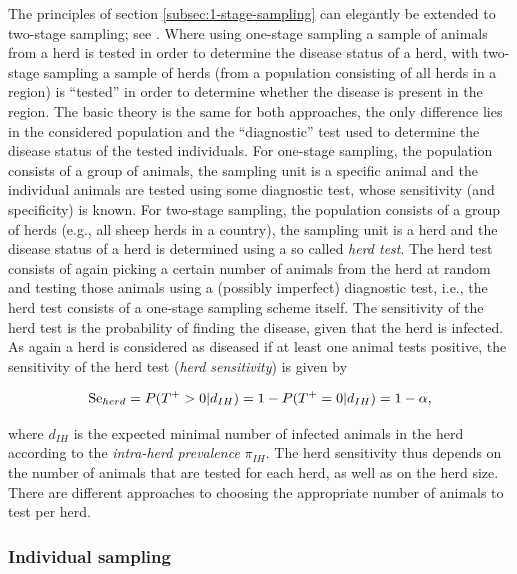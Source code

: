 \documentclass[nojss]{jss}
\begin{document}
The principles of section \ref{subsec:1-stage-sampling} can elegantly be extended to two-stage sampling; see \cite{CaBa98B}. Where using one-stage sampling a sample of animals from a herd is tested in order to determine the disease status of a herd, with two-stage sampling  a sample of herds (from a population consisting of all herds in a region) is ``tested'' in order to determine whether the disease is present in the region. The basic theory is the same for both approaches, the only difference lies in the considered population and the ``diagnostic'' test used to determine the disease status of the tested individuals. For one-stage sampling, the population consists of a group of animals, the sampling unit  is a specific animal and the individual animals are tested using some diagnostic test, whose sensitivity (and specificity) is known. For two-stage sampling, the population consists of a group of herds (e.g., all sheep herds in a country), the sampling unit is a herd and the disease status of a herd is determined using a so called  \emph{herd test}. The herd test consists of again picking a certain number of animals from the herd at random and testing those animals using a (possibly imperfect) diagnostic test, i.e., the herd test consists of a one-stage sampling scheme itself. The sensitivity of the herd test is the probability of finding the disease, given that the herd is infected. As again a herd is considered as diseased if at least one animal tests positive, the sensitivity of the herd test (\emph{herd sensitivity})   is given by

$$\mbox{Se}_{herd} = P(T^+>0|d_{IH}) = 1 - P(T^+ = 0|d_{IH}) = 1 - \alpha,$$

where $d_{IH}$ is the expected minimal number of infected animals in the herd according to the   \emph{intra-herd prevalence} $\pi_{IH}$. The herd sensitivity thus depends on the number of animals that are tested for each herd, as well as on the herd size. There are different approaches to choosing the appropriate number of animals to test per herd.



\subsubsection{Individual sampling}
\label{subsubsec:ind-sampling}
\end{document}
